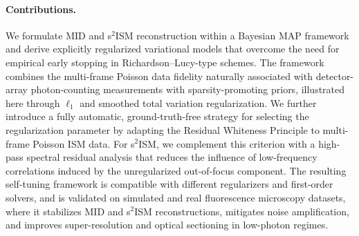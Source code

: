 \documentclass[letterpaper]{article}
\begin{document}
\paragraph{Contributions.}
We formulate MID and s$^2$ISM reconstruction within a Bayesian MAP framework and derive explicitly regularized variational models that overcome the need for empirical early stopping in Richardson–Lucy-type schemes. The framework combines the multi-frame Poisson data fidelity naturally associated with detector-array photon-counting measurements with sparsity-promoting priors, illustrated here through $\ell_1$ and smoothed total variation regularization. We further introduce a fully automatic, ground-truth-free strategy for selecting the regularization parameter by adapting the Residual Whiteness Principle to multi-frame Poisson ISM data. For s$^2$ISM, we complement this criterion with a high-pass spectral residual analysis that reduces the influence of low-frequency correlations induced by the unregularized out-of-focus component. The resulting self-tuning framework is compatible with different regularizers and first-order solvers, and is validated on simulated and real fluorescence microscopy datasets, where it stabilizes MID and s$^2$ISM reconstructions, mitigates noise amplification, and improves super-resolution and optical sectioning in low-photon regimes.
\end{document}
